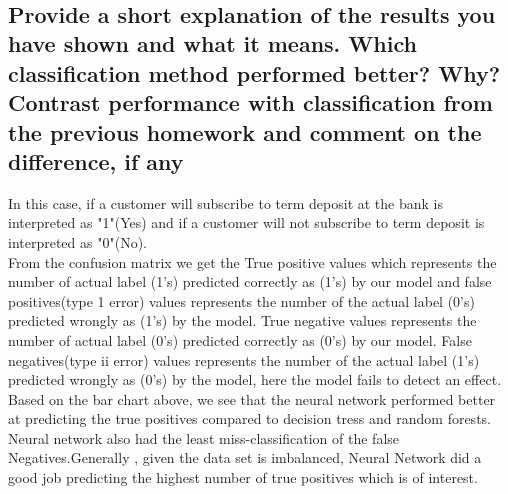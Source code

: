 \\


\newpage
\subsection{Provide a short explanation of the results you have shown and what it means. Which classification method performed better? Why? Contrast performance with classification from the previous homework and comment on the difference, if any}
In this case, if a customer will subscribe to term deposit at the bank is interpreted as "1"(Yes) and if a customer will not subscribe to term deposit is interpreted as "0"(No).\\

From the confusion matrix we get the True positive values  which represents the number of actual label (1's) predicted correctly as (1's) by our model and false positives(type 1 error) values represents the number of the  actual label (0's) predicted wrongly as (1's) by the model. True negative values represents the number of actual label (0's) predicted correctly as (0's) by our model. False negatives(type ii error) values represents the number of the  actual label (1's) predicted wrongly as (0's) by the model, here the model fails to detect an effect. Based on the bar chart above, we see that the neural network performed better at predicting the true positives compared to decision tress and random forests. Neural network also had the least miss-classification of the false Negatives.Generally , given the data set is imbalanced, Neural Network did a good job predicting the highest number of true positives which is of interest. 



